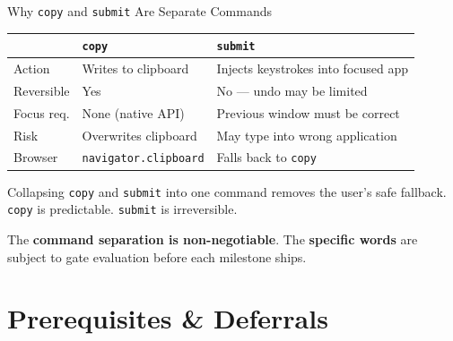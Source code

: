 \documentclass{beamer}
\begin{document}
\begin{frame}{Why \texttt{copy} and \texttt{submit} Are Separate Commands}
    \small
    \begin{table}
    \centering\footnotesize
    \begin{tabular}{@{} l p{3.9cm} p{3.9cm} @{}}
        \toprule
        & \textbf{\texttt{copy}} & \textbf{\texttt{submit}} \\
        \midrule
        Action    & Writes to clipboard      & Injects keystrokes into focused app \\
        Reversible & Yes                     & No --- undo may be limited \\
        Focus req. & None (native API)       & Previous window must be correct \\
        Risk       & Overwrites clipboard    & May type into wrong application \\
        Browser    & \texttt{navigator.clipboard} & Falls back to \texttt{copy} \\
        \bottomrule
    \end{tabular}
    \end{table}

    \vspace{0.3em}
    Collapsing \texttt{copy} and \texttt{submit} into one command removes the user's
    safe fallback. \texttt{copy} is predictable. \texttt{submit} is irreversible.

    \vspace{0.2em}
    The \textbf{command separation is non-negotiable}.
    The \textbf{specific words} are subject to gate evaluation before each milestone ships.
\end{frame}


\section{Prerequisites \& Deferrals}
\end{document}
